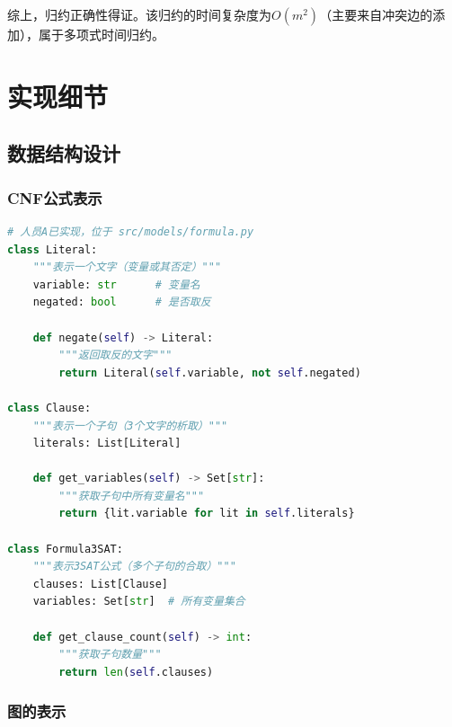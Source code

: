 \documentclass{sysucseexp}
\begin{document}
综上，归约正确性得证。该归约的时间复杂度为$O(m^2)$（主要来自冲突边的添加），属于多项式时间归约。


\section{实现细节}

\subsection{数据结构设计}

\subsubsection{CNF公式表示}

\begin{lstlisting}[language=Python]
# 人员A已实现，位于 src/models/formula.py
class Literal:
    """表示一个文字（变量或其否定）"""
    variable: str      # 变量名
    negated: bool      # 是否取反
    
    def negate(self) -> Literal:
        """返回取反的文字"""
        return Literal(self.variable, not self.negated)

class Clause:
    """表示一个子句（3个文字的析取）"""
    literals: List[Literal]
    
    def get_variables(self) -> Set[str]:
        """获取子句中所有变量名"""
        return {lit.variable for lit in self.literals}

class Formula3SAT:
    """表示3SAT公式（多个子句的合取）"""
    clauses: List[Clause]
    variables: Set[str]  # 所有变量集合
    
    def get_clause_count(self) -> int:
        """获取子句数量"""
        return len(self.clauses)
\end{lstlisting}

\subsubsection{图的表示}
\end{document}
